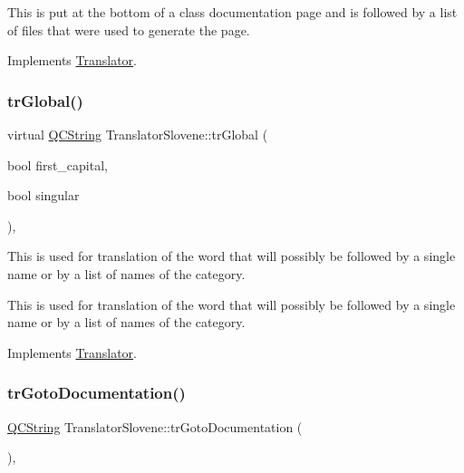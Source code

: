 This is put at the bottom of a class documentation page and is followed by a list of files that were used to generate the page. 

Implements \mbox{\hyperlink{class_translator}{Translator}}.

\mbox{\label{class_translator_slovene_a1e2b491d74de98b7562a21968e1863d0}} 
\subsubsection{\texorpdfstring{trGlobal()}{trGlobal()}}
{\footnotesize\ttfamily virtual \mbox{\hyperlink{class_q_c_string}{Q\+C\+String}} Translator\+Slovene\+::tr\+Global (\begin{DoxyParamCaption}\item[{bool}]{first\+\_\+capital,  }\item[{bool}]{singular }\end{DoxyParamCaption})\hspace{0.3cm}{\ttfamily [inline]}, {\ttfamily [virtual]}}

This is used for translation of the word that will possibly be followed by a single name or by a list of names of the category.

This is used for translation of the word that will possibly be followed by a single name or by a list of names of the category. 

Implements \mbox{\hyperlink{class_translator}{Translator}}.

\mbox{\label{class_translator_slovene_a10ef9490a1d8242fab815426a24ea41c}} 
\subsubsection{\texorpdfstring{trGotoDocumentation()}{trGotoDocumentation()}}
{\footnotesize\ttfamily \mbox{\hyperlink{class_q_c_string}{Q\+C\+String}} Translator\+Slovene\+::tr\+Goto\+Documentation (\begin{DoxyParamCaption}{ }\end{DoxyParamCaption})\hspace{0.3cm}{\ttfamily [inline]}, {\ttfamily [virtual]}}

